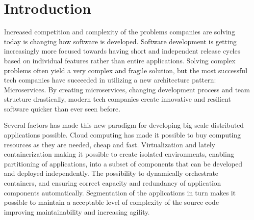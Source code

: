 \chapter{Introduction}
\label{ch:introduction}
Increased competition and complexity of the problems companies are solving today is changing how software is developed. Software development is getting increasingly more focused towards having short and independent release cycles based on individual features rather than entire applications. Solving complex problems often yield a very complex and fragile solution, but the most successful tech companies have succeeded in utilizing a new architecture pattern: Microservices. By creating microservices, changing development process and team structure drastically, modern tech companies create innovative and resilient software quicker than ever seen before.

Several factors has made this new paradigm for developing big scale distributed applications possible. Cloud computing has made it possible to buy computing resources as they are needed, cheap and fast. Virtualization and lately containerization making it possible to create isolated environments, enabling partitioning of applications, into a subset of components that can be developed and deployed independently. The possibility to dynamically orchestrate containers, and ensuring correct capacity and redundancy of application components automatically. Segmentation of the applications in turn makes it possible to maintain a acceptable level of complexity of the source code improving maintainability and increasing agility.


